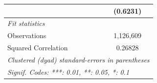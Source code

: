 \begin{tabular}{lc}
                                                             & (0.6231)\\   
   \midrule
   \emph{Fit statistics}\\
   Observations                                              & 1,126,609\\  
   Squared Correlation                                       & 0.26828\\  
   \midrule \midrule
   \multicolumn{2}{l}{\emph{Clustered (dyad) standard-errors in parentheses}}\\
   \multicolumn{2}{l}{\emph{Signif. Codes: ***: 0.01, **: 0.05, *: 0.1}}\\
\end{tabular}
\par\endgroup


